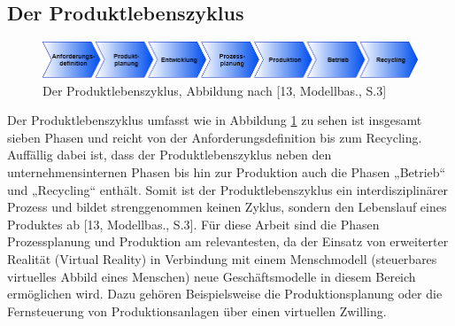 \subsection{Der Produktlebenszyklus}\label{sec:Produktlebenszyklus}
\begin{figure}[h]
	\centering
	\includegraphics[width=1\linewidth]{Bilder/A8_Produktlebenszyklus}
	\caption{Der Produktlebenszyklus, Abbildung nach [13, Modellbas., S.3]}
	\label{fig:Produktlebenszyklus}
\end{figure}
\noindent Der Produktlebenszyklus umfasst wie in Abbildung \ref{fig:Produktlebenszyklus} zu sehen ist insgesamt sieben Phasen und reicht von der Anforderungsdefinition bis zum Recycling. Auffällig dabei ist, dass der Produktlebenszyklus neben den unternehmensinternen Phasen bis hin zur Produktion auch die Phasen „Betrieb“ und „Recycling“ enthält. Somit ist der Produktlebenszyklus ein interdisziplinärer Prozess und bildet strenggenommen keinen Zyklus, sondern den Lebenslauf eines Produktes ab [13, Modellbas., S.3].
\newline\newline
Für diese Arbeit sind die Phasen Prozessplanung und Produktion am relevantesten, da der Einsatz von erweiterter Realität (Virtual Reality) in Verbindung mit einem Menschmodell (steuerbares virtuelles Abbild eines Menschen) neue Geschäftsmodelle in diesem Bereich ermöglichen wird. Dazu gehören Beispielsweise die Produktionsplanung oder die Fernsteuerung von Produktionsanlagen über einen virtuellen Zwilling.


